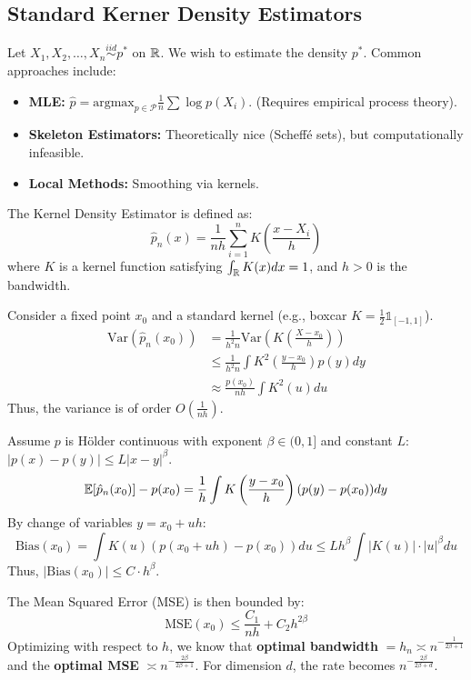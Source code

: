 \subsection{Standard Kerner Density Estimators}

Let $X_1, X_2, \dots, X_n \overset{iid}{\sim} p^*$ on $\mathbb{R}$. We wish to estimate the density $p^*$.
Common approaches include:
\begin{itemize}
    \item \textbf{MLE:} $\hat{p} = \text{argmax}_{p \in \mathcal{P}} \frac{1}{n} \sum \log p(X_i)$. (Requires empirical process theory).
    \item \textbf{Skeleton Estimators:} Theoretically nice (Scheffé sets), but computationally infeasible.
    \item \textbf{Local Methods:} Smoothing via kernels.
\end{itemize}

The Kernel Density Estimator is defined as:
\[
\hat p_n(x) = \frac{1}{nh} \sum_{i=1}^n K\left( \frac{x - X_i}{h} \right)
\]
where $K$ is a kernel function satisfying $\int_{\mathbb{R}} K(x) dx = 1$, and $h > 0$ is the bandwidth.

Consider a fixed point $x_0$ and a standard kernel (e.g., boxcar $K = \frac{1}{2}\mathbb{1}_{[-1,1]}$).
\begin{align*}
\text{Var}(\hat p_n(x_0)) &= \frac{1}{h^2 n} \text{Var}\left( K\left( \frac{X-x_0}{h} \right) \right) \\
&\le \frac{1}{h^2 n} \int K^2 \left( \frac{y-x_0}{h} \right) p(y) dy \\
&\approx \frac{p(x_0)}{nh} \int K^2(u) du
\end{align*}
Thus, the variance is of order $O(\frac{1}{nh})$.

Assume $p$ is H\"older continuous with exponent $\beta \in (0, 1]$ and constant $L$: $|p(x) - p(y)| \le L|x-y|^\beta$.
\[
\mathbb{E}[\hat p_n(x_0)] - p(x_0) = \frac{1}{h} \int K\left( \frac{y-x_0}{h} \right) (p(y) - p(x_0)) dy
\]
By change of variables $y = x_0 + uh$:
\[
\text{Bias}(x_0) = \int K(u) (p(x_0 + uh) - p(x_0)) du \le L h^\beta \int |K(u)| \cdot |u|^\beta du
\]
Thus, $|\text{Bias}(x_0)| \le C \cdot h^\beta$.

The Mean Squared Error (MSE) is then bounded by:
\[
\text{MSE}(x_0) \le \frac{C_1}{nh} + C_2 h^{2\beta}
\]
Optimizing with respect to $h$, we know that \textbf{optimal bandwidth} $=h_n \asymp n^{-\frac{1}{2\beta+1}}$ and the \textbf{optimal MSE} $\asymp n^{-\frac{2\beta}{2\beta+1}}$. For dimension $d$, the rate becomes $n^{-\frac{2\beta}{2\beta+d}}$.

